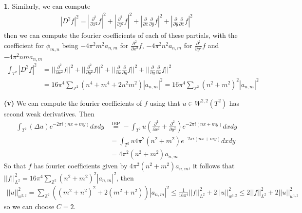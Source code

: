 \documentclass[10.5pt]{article}
\theoremstyle{definition}
\newtheorem{pb}{}
\newcommand{\abs}[1]{\left\vert#1\right\vert}
\newcommand{\norm}[1]{\lvert\lvert#1\rvert\rvert}
\newcommand{\px}{\frac{\partial}{\partial x}}
\newcommand{\py}{\frac{\partial}{\partial y}}
\newcommand{\pxpx}{\frac{\partial^2}{\partial x^2}}
\newcommand{\pypy}{\frac{\partial^2}{\partial y^2}}
\begin{document}
\begin{pb}
        Similarly, we can compute
        \begin{align}
            \abs{D^2 f}^2 = \abs{\pxpx f}^2 + \abs{\pypy f}^2 + \abs{\px\py f}^2 + \abs{\py\px f}^2
        \end{align}
        then we can compute the fourier coefficients of each of these partials, with the coefficient for \(\phi_{m,n}\) being \(-4\pi^2 m^2 a_{n,m}\) for \(\pxpx f\), \(-4\pi^2 n^2 a_{n,m}\) for \(\pypy f\) and \(-4\pi^2 nm a_{n,m}\)
        \begin{align}
            \int_{T^2}\abs{D^2 f}^2 &= \norm{\pxpx f}^2 + \norm{\pypy f}^2 + \norm{\px\py f}^2 + \norm{\py\px f}^2 \\
            &= 16\pi^4 \sum_{\mathbb{Z}^2} (n^4 + m^4 + 2n^2m^2)\abs{a_{n,m}}^2 = 16\pi^4 \sum_{\mathbb{Z}^2} (n^2 + m^2)^2 \abs{a_{n,m}}^2
        \end{align}

        \textbf{(v)} We can compute the fourier coefficients of \(f\) using that \(u \in W^{2,2}(T^2)\) has second weak derivatives. Then
        \begin{align}
            \int_{T^2} (\Delta u) e^{-2\pi i (nx + my)}dxdy &\overset{\text{IBP}}{=} -\int_{T^2}u \left(\pxpx + \pypy\right)e^{-2\pi i (nx + my)}dxdy \label{Laplacian1} \\
            &= \int_{T^2} u 4\pi^2 (n^2 + m^2)e^{-2\pi i (nx + my)}dxdy \\
            &= 4\pi^2(n^2 + m^2) a_{n,m} \label{Laplacian3}
        \end{align}
        So that \(f\) has fourier coefficients given by \(4\pi^2(n^2 + m^2) a_{n,m}\), it follows that \(\norm{f}_{L^2}^2 = 16\pi^4 \sum_{\mathbb{Z}^2}(n^2 + m^2)^2\abs{a_{n,m}}^2\), then
        \begin{align}
            \norm{u}_{w^{2,2}}^2 = \sum_{\mathbb{Z}^2} ((m^2 + n^2)^2 + 2(m^2 + n^2))\abs{a_{n,m}}^2 \leq \frac{1}{16\pi^4}\norm{f}^2_{L^2} + 2\norm{u}_{w^{1,2}}^2 \leq 2 \norm{f}^2_{L^2} + 2\norm{u}_{w^{1,2}}^2
        \end{align}
        so we can choose \(C = 2\).


\end{pb}
\end{document}
